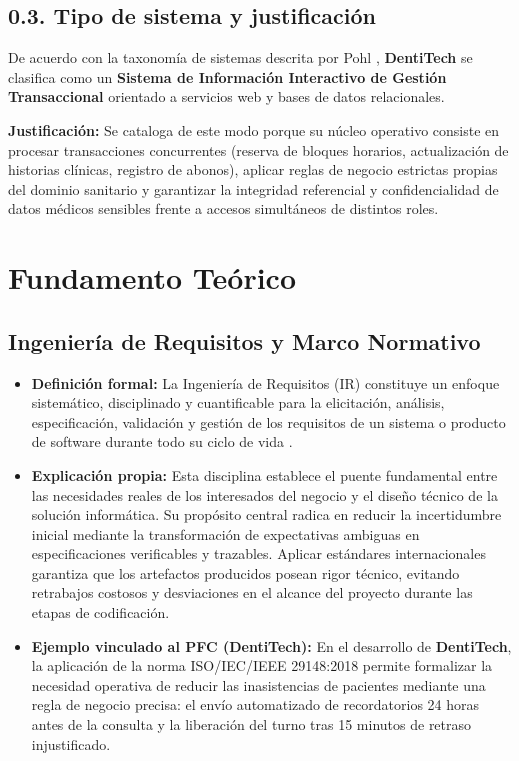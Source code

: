 \documentclass[11pt,a4paper]{article}
\begin{document}
\subsection*{0.3. Tipo de sistema y justificación}

De acuerdo con la taxonomía de sistemas descrita por Pohl \cite{pohl2025}, \textbf{DentiTech} se clasifica como un \textbf{Sistema de Información Interactivo de Gestión Transaccional} orientado a servicios web y bases de datos relacionales. 

\textbf{Justificación:} Se cataloga de este modo porque su núcleo operativo consiste en procesar transacciones concurrentes (reserva de bloques horarios, actualización de historias clínicas, registro de abonos), aplicar reglas de negocio estrictas propias del dominio sanitario y garantizar la integridad referencial y confidencialidad de datos médicos sensibles frente a accesos simultáneos de distintos roles.

\newpage

\section{Fundamento Teórico}

\subsection{Ingeniería de Requisitos y Marco Normativo}

\begin{itemize}
    \item \textbf{Definición formal:} La Ingeniería de Requisitos (IR) constituye un enfoque sistemático, disciplinado y cuantificable para la elicitación, análisis, especificación, validación y gestión de los requisitos de un sistema o producto de software durante todo su ciclo de vida \cite{ieee29148, pohl2025, swebok2024}.
    \item \textbf{Explicación propia:} Esta disciplina establece el puente fundamental entre las necesidades reales de los interesados del negocio y el diseño técnico de la solución informática. Su propósito central radica en reducir la incertidumbre inicial mediante la transformación de expectativas ambiguas en especificaciones verificables y trazables. Aplicar estándares internacionales garantiza que los artefactos producidos posean rigor técnico, evitando retrabajos costosos y desviaciones en el alcance del proyecto durante las etapas de codificación.
    \item \textbf{Ejemplo vinculado al PFC (DentiTech):} En el desarrollo de \textbf{DentiTech}, la aplicación de la norma ISO/IEC/IEEE 29148:2018 \cite{ieee29148} permite formalizar la necesidad operativa de reducir las inasistencias de pacientes mediante una regla de negocio precisa: el envío automatizado de recordatorios 24 horas antes de la consulta y la liberación del turno tras 15 minutos de retraso injustificado.
\end{itemize}
\end{document}
